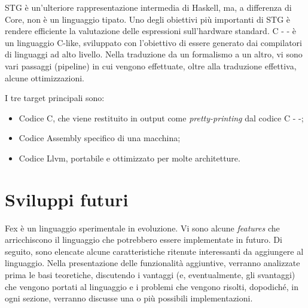\documentclass[10pt,a4paper]{article}
\begin{document}
\newline

STG è un'ulteriore rappresentazione intermedia di Haskell, ma, a differenza di Core, non è un linguaggio tipato.
Uno degli obiettivi più importanti di STG è rendere efficiente la valutazione delle espressioni sull'hardware standard.
C - - è un linguaggio C-like, sviluppato con l'obiettivo di essere generato dai compilatori di linguaggi ad alto livello.
Nella traduzione da un formalismo a un altro, vi sono vari passaggi (pipeline) in cui vengono effettuate, oltre alla
traduzione effettiva, alcune ottimizzazioni.

I tre target principali sono:
\begin{itemize}
    \item Codice C, che viene restituito in output come \textit{pretty-printing} dal codice C - -;
    \item Codice Assembly specifico di una macchina;
    \item Codice Llvm, portabile e ottimizzato per molte architetture.
\end{itemize}

\hypertarget{Sviluppi futuri}{\section{Sviluppi futuri}}
Fex è un linguaggio sperimentale in evoluzione. Vi sono alcune \textit{features} che arricchiscono il linguaggio che
potrebbero essere implementate in futuro. Di seguito, sono elencate alcune caratteristiche ritenute interessanti da
aggiungere al linguaggio. Nella presentazione delle funzionalità aggiuntive, verranno analizzate prima le
basi teoretiche, discutendo i vantaggi (e, eventualmente, gli svantaggi) che vengono portati al linguaggio e i problemi
che vengono risolti, dopodiché, in ogni sezione, verranno discusse una o più possibili implementazioni.
\end{document}
